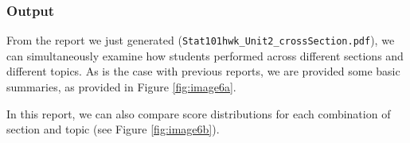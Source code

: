 \documentclass{article}\usepackage[]{graphicx}\usepackage[]{color}
\numberwithin{equation}{section} %
\begin{document}
\subsubsection{Output}

From the report we just generated (\texttt{Stat101hwk\_Unit2\_crossSection.pdf}), we can simultaneously examine how students performed across different sections and different topics. As is the case with previous reports, we are provided some basic summaries, as provided in Figure \ref{fig:image6a}.

\begin{center}
\captionsetup{width=0.4\textwidth}
\label{fig:image6a}
\end{center}

In this report, we can also compare score distributions for each combination of section and topic (see Figure \ref{fig:image6b}).

\begin{center}
\captionsetup{width=0.8\textwidth}
\label{fig:image6b}
\end{center}
\end{document}
